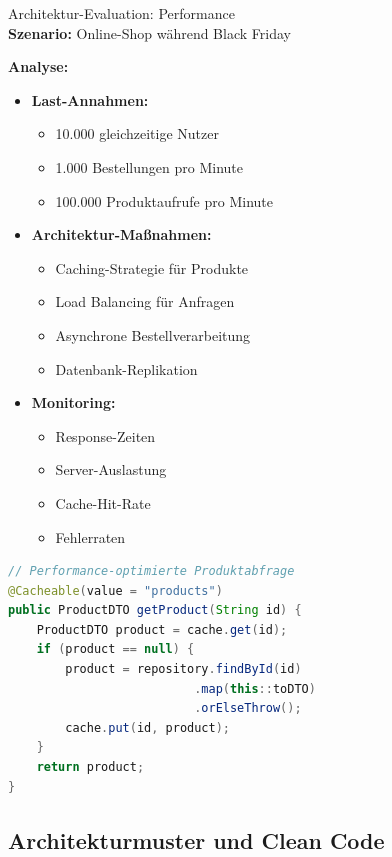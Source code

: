 \begin{example2}{Architektur-Evaluation: Performance}\\
\textbf{Szenario:} Online-Shop während Black Friday

\textbf{Analyse:}
\begin{itemize}
    \item \textbf{Last-Annahmen:}
    \begin{itemize}
        \item 10.000 gleichzeitige Nutzer
        \item 1.000 Bestellungen pro Minute
        \item 100.000 Produktaufrufe pro Minute
    \end{itemize}
    
    \item \textbf{Architektur-Maßnahmen:}
    \begin{itemize}
        \item Caching-Strategie für Produkte
        \item Load Balancing für Anfragen
        \item Asynchrone Bestellverarbeitung
        \item Datenbank-Replikation
    \end{itemize}
    
    \item \textbf{Monitoring:}
    \begin{itemize}
        \item Response-Zeiten
        \item Server-Auslastung
        \item Cache-Hit-Rate
        \item Fehlerraten
    \end{itemize}
\end{itemize}

\begin{lstlisting}[language=Java, style=basesmol]
// Performance-optimierte Produktabfrage
@Cacheable(value = "products")
public ProductDTO getProduct(String id) {
    ProductDTO product = cache.get(id);
    if (product == null) {
        product = repository.findById(id)
                          .map(this::toDTO)
                          .orElseThrow();
        cache.put(id, product);
    }
    return product;
}
\end{lstlisting}
\end{example2}


\pagebreak

\subsection{Architekturmuster und Clean Code}

